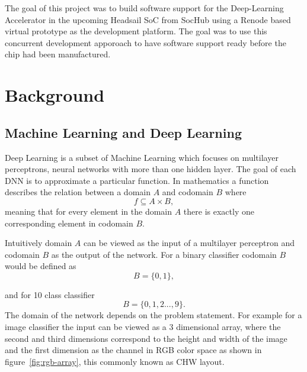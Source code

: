 \documentclass[12pt,a4paper,english
]{tunithesis}
\begin{document}
The goal of this project was to build software support for the Deep-Learning Accelerator in the upcoming Headsail SoC from SocHub using a Renode based virtual prototype as the development platform. The goal was to use this concurrent development apporoach to have software support ready before the chip had been manufactured.

\chapter{Background}
\label{ch:background}
\section{Machine Learning and Deep Learning}
Deep Learning is a subset of Machine Learning which focuses on multilayer perceptrons, neural networks with more than one hidden layer.
The goal of each DNN is to approximate a particular function.
In mathematics a function describes the relation between a domain $A$ and codomain $B$ where
\begin{equation}
  f \subseteq A \times B,
\end{equation}
meaning that for every element in the domain $A$ there is exactly one corresponding element in codomain $B$.

Intuitively domain $A$ can be viewed as the input of a multilayer perceptron and codomain $B$ as the output of the network. For a binary classifier codomain $B$ would be defined as
\begin{equation}
  B = \{0, 1\},
\end{equation}

and for 10 class classifier
\begin{equation}
  B = \{0, 1, 2 ..., 9\}.
\end{equation}
The domain of the network depends on the problem statement. For example for a image classifier the input can be viewed as a 3 dimensional array, where the second and third dimensions correspond to the height and width of the image and the first dimension as the channel in RGB color space as shown in figure~\ref{fig:rgb-array}, this commonly known as CHW layout.
\end{document}
